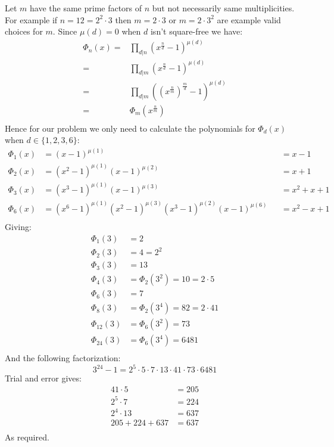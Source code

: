 Let $m$ have the same prime factors of $n$ but not necessarily same multiplicities.
For example if $n=12=2^2\cdot 3$ then $m=2\cdot 3$ or $m=2\cdot 3^2$ are example valid choices for $m$.
Since $\mu(d)=0$ when $d$ isn't square-free we have:
\[\begin{aligned}
	\Phi_n(x) =& \prod_{d|n} (x^\frac{n}{d}-1)^{\mu(d)}\\
	=& \prod_{d|m} (x^\frac{n}{d}-1)^{\mu(d)}\\
	=& \prod_{d|m} \left(\left(x^\frac{n}{m}\right)^\frac{m}{d}-1\right)^{\mu(d)}\\
	=& \Phi_m\left(x^\frac{n}{m}\right)\\
\end{aligned}\]
Hence for our problem we only need to calculate the polynomials for $\Phi_d(x)$ when $d\in\{1,2,3,6\}$:
\[\begin{aligned}
	\Phi_1(x) &= (x-1)^{\mu(1)}&& = x-1\\
	\Phi_2(x) &= (x^2-1)^{\mu(1)}(x-1)^{\mu(2)} &&= x+1\\
	\Phi_3(x) &= (x^3-1)^{\mu(1)}(x-1)^{\mu(3)} &&= x^2+x+1\\
	\Phi_6(x) &= (x^6-1)^{\mu(1)}(x^2-1)^{\mu(3)}(x^3-1)^{\mu(2)}(x-1)^{\mu(6)} &&= x^2-x+1\\
\end{aligned}\]
Giving:
\[\begin{aligned}
	\Phi_1(3) &= 2\\
	\Phi_2(3) &= 4 = 2^2\\
	\Phi_3(3) &= 13\\
	\Phi_4(3) &=\Phi_2(3^2)= 10 = 2\cdot 5\\
	\Phi_6(3) &= 7\\
	\Phi_8(3) &=\Phi_2(3^4)= 82 = 2\cdot 41\\
	\Phi_{12}(3) &=\Phi_6(3^2)= 73\\
	\Phi_{24}(3) &=\Phi_6(3^4)= 6481\\
\end{aligned}\]
And the following factorization:
\[3^{24}-1 = 2^5\cdot5\cdot7\cdot13\cdot41\cdot73\cdot6481\]
Trial and error gives:
\[\begin{aligned}
	41\cdot 5 &= 205\\
	2^5\cdot 7 &= 224\\
	2^4\cdot 13 &= 637\\
	205+224+637&=637\\
\end{aligned}\]
As required.
\\

